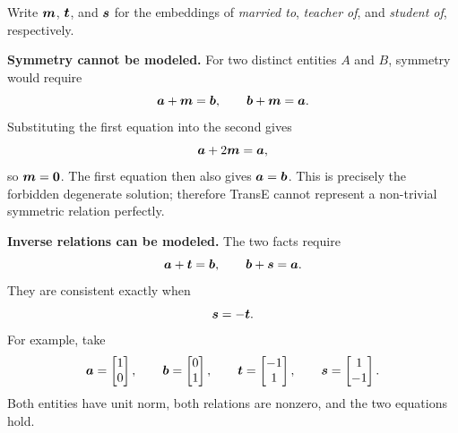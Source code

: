 \begin{solution}
Write \(\bm{m}\), \(\bm{t}\), and \(\bm{s}\) for the embeddings of
\emph{married to}, \emph{teacher of}, and \emph{student of}, respectively.

\textbf{Symmetry cannot be modeled.}  For two distinct entities \(A\) and
\(B\), symmetry would require
\[
  \bm{a}+\bm{m}=\bm{b},
  \qquad
  \bm{b}+\bm{m}=\bm{a}.
\]
Substituting the first equation into the second gives
\[
  \bm{a}+2\bm{m}=\bm{a},
\]
so \(\bm{m}=\bm{0}\).  The first equation then also gives
\(\bm{a}=\bm{b}\).  This is precisely the forbidden degenerate solution;
therefore TransE cannot represent a non-trivial symmetric relation perfectly.

\textbf{Inverse relations can be modeled.}  The two facts require
\[
  \bm{a}+\bm{t}=\bm{b},
  \qquad
  \bm{b}+\bm{s}=\bm{a}.
\]
They are consistent exactly when
\[
  \bm{s}=-\bm{t}.
\]
For example, take
\[
  \bm{a}=\begin{bmatrix}1\\0\end{bmatrix},\qquad
  \bm{b}=\begin{bmatrix}0\\1\end{bmatrix},\qquad
  \bm{t}=\begin{bmatrix}-1\\1\end{bmatrix},\qquad
  \bm{s}=\begin{bmatrix}1\\-1\end{bmatrix}.
\]
Both entities have unit norm, both relations are nonzero, and the two
equations hold.


\end{solution}
